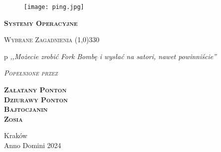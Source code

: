 \begin{titlepage} 
    \begin{center}
         \begin{figure}[h]
            \centering
           \texttt{[image: ping.jpg]}
        \end{figure}
        
        \Huge
        \textbf{\textsc{Systemy Operacyjne}}
        
        \vspace{0.5cm}
        \Large
        \textsc{Wybrane Zagadnienia}
        \line(1,0){330}
        
        \normalsize
        p
        \vspace{1cm}
        \textit{,,Możecie zrobić Fork Bombę i wysłać na satori, nawet powinniście''}
        \vspace{1cm}

        \textit{\textsc{Popełnione przez}}\\
        \vspace{5mm}
  
        \textbf{\textsc{Załatany Ponton\\ Dziurawy Ponton \\Bajtocjanin \\ Zosia}}
 
        \vfill

        Kraków \\
        Anno Domini 2024
    \end{center}
\end{titlepage}